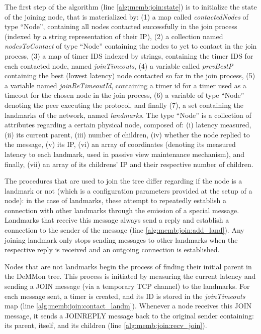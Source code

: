 

The first step of the algorithm (line \ref{alg:memb:join:state}) is to initialize the state of the joining node, that is materialized by: (1) a map called \textit{contactedNodes} of type ``Node'', containing all nodes contacted successfully in the join process (indexed by a string representation of their IP), (2) a collection named \textit{nodesToContact} of type ``Node'' containing the nodes to yet to contact in the join process, (3) a map of timer IDS indexed by strings, containing the timer IDS for each contacted node, named \textit{joinTimeouts}, (4) a variable called \textit{prevBestP} containing the best (lowest latency) node contacted so far in the join process, (5) a variable named \textit{joinReTimeoutId}, containing a timer id for a timer used as a timeout for the chosen node in the join process, (6) a variable of type ``Node'' denoting the peer executing the protocol, and finally (7), a set containing the landmarks of the network, named \textit{landmarks}. The type ``Node'' is a collection of attributes regarding a certain physical node, composed of: (i) latency measured, (ii) its current parent, (iii) number of children, (iv) whether the node replied to the message, (v) its IP, (vi) an array of coordinates (denoting its measured latency to each landmark, used in passive view maintenance mechanism), and finally, (vii) an array of its childrens' IP and their respective number of children.
 
The procedures that are used to join the tree differ regarding if the node is a landmark or not (which is a configuration parameters provided at the setup of a node): in the case of landmarks, these attempt to repeatedly establish a connection with other landmarks through the emission of a special message. Landmarks that receive this message always send a reply and establish a connection to the sender of the message (line \ref{alg:memb:join:add_land}). Any joining landmark only stops sending messages to other landmarks when the respective reply is received and an outgoing connection is established.

Nodes that are not landmarks begin the process of finding their initial parent in the DeMMon tree. This process is initiated by measuring the current latency and sending a JOIN message (via a temporary TCP channel) to the landmarks. For each message sent, a timer is created, and its ID is stored in the \textit{joinTimeouts} map (line \ref{alg:memb:join:contact_landm}). Whenever a node receives this JOIN message, it sends a JOINREPLY message back to the original sender containing: its parent, itself, and its children (line \ref{alg:memb:join:recv_join}).

